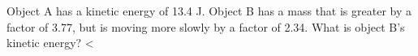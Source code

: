 Object A has a kinetic energy of 13.4 J. Object B has a
        mass that is greater by a factor of 3.77, but is moving more
        slowly by a factor of 2.34. What is object B's kinetic
        energy?
        <%
